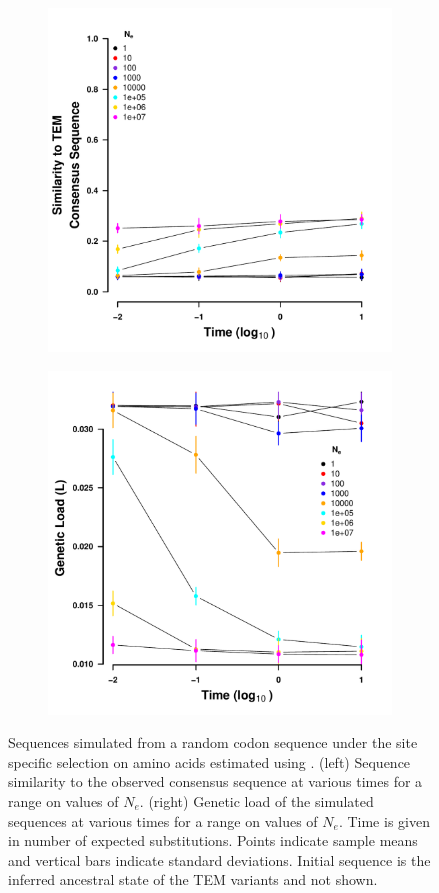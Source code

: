 \documentclass[12pt]{article}
\begin{document}
\begin{figure}[h]
    \centering
    \begin{subfigure}
        \centering
        \includegraphics[width=.45\textwidth]{img/simulated_dist_time_SELAC_random.pdf}
    \end{subfigure}
    \begin{subfigure}
        \centering
        \includegraphics[width=.45\textwidth]{img/simulated_gl_time_SELAC_random.pdf}
    \end{subfigure}
    \caption{{Sequences simulated from a random codon sequence under the site specific selection on amino acids estimated using \selac. 
    (left) Sequence similarity to the observed consensus sequence at various times for a range on values of $N_e$.
    (right) Genetic load of the simulated sequences at various times for a range on values of $N_e$.
    Time is given in number of expected substitutions.
    Points indicate sample means and vertical bars indicate standard deviations. Initial sequence is the inferred ancestral state of the TEM variants and not shown.}}
    \label{fig:selac_sim_rand}
\end{figure}
\end{document}
